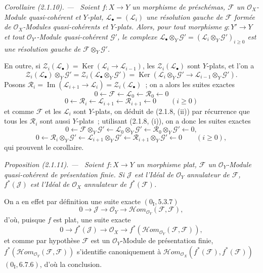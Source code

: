 \documentclass[10pt,oneside]{book}
\newcommand{\oldpage}[2][]{%
  \setcounter{footnote}{0}%
  \marginpar{\scriptsize\textbf{#1}~|~#2}\ignorespaces}
\newenvironment{proposition}[1][]{%
  \par\medskip\noindent\itshape Proposition (#1). ---\ }{\par}
\newenvironment{corollary}[1][]{%
  \par\medskip\noindent\itshape Corollaire (#1). ---\ }{\par}
\begin{document}
\oldpage[IV-2]{8}
\begin{corollary}[2.1.10]
\label{IV.2.1.10-fr}
Soient $f:X\to Y$ un morphisme de préschémas, $\mathscr F$ un
$\mathcal O_X$-Module quasi-cohérent et $Y$-plat,
$\mathscr L_\bullet=(\mathscr L_i)$ une résolution gauche de $\mathscr F$
formée de $\mathcal O_X$-Modules quasi-cohérents et $Y$-plats. Alors, pour
tout morphisme $g:Y'\to Y$ et tout $\mathcal O_{Y'}$-Module quasi-cohérent
$\mathscr G'$, le complexe
$\mathscr L_\bullet\otimes_Y\mathscr G'=
(\mathscr L_i\otimes_Y\mathscr G')_{i\geq0}$ est une résolution gauche de
$\mathscr F\otimes_Y\mathscr G'$.

En outre, si
$\mathscr Z_i(\mathscr L_\bullet)=\operatorname{Ker}
(\mathscr L_i\to\mathscr L_{i-1})$, les $\mathscr Z_i(\mathscr L_\bullet)$
sont $Y$-plats, et l'on a
\[
\mathscr Z_i(\mathscr L_\bullet)\otimes_Y\mathscr G'
=\mathscr Z_i(\mathscr L_\bullet\otimes_Y\mathscr G')
=\operatorname{Ker}(\mathscr L_i\otimes_Y\mathscr G'
\to\mathscr L_{i-1}\otimes_Y\mathscr G').
\]
Posons
$\mathscr R_i=\operatorname{Im}(\mathscr L_{i+1}\to\mathscr L_i)
=\mathscr Z_i(\mathscr L_\bullet)$~; on a alors les suites exactes
\[
0\leftarrow\mathscr F\leftarrow\mathscr L_0\leftarrow\mathscr R_0\leftarrow0
\]
\[
0\leftarrow\mathscr R_i\leftarrow\mathscr L_{i+1}
\leftarrow\mathscr R_{i+1}\leftarrow0\qquad(i\geq0)
\]
et comme $\mathscr F$ et les $\mathscr L_i$ sont $Y$-plats, on déduit de
(2.1.8, (ii)) par récurrence que tous les $\mathscr R_i$ sont aussi
$Y$-plats~; utilisant (2.1.8, (i)), on a donc les suites exactes
\[
0\leftarrow\mathscr F\otimes_Y\mathscr G'
\leftarrow\mathscr L_0\otimes_Y\mathscr G'
\leftarrow\mathscr R_0\otimes_Y\mathscr G'\leftarrow0,
\]
\[
0\leftarrow\mathscr R_i\otimes_Y\mathscr G'
\leftarrow\mathscr L_{i+1}\otimes_Y\mathscr G'
\leftarrow\mathscr R_{i+1}\otimes_Y\mathscr G'\leftarrow0
\qquad(i\geq0),
\]
qui prouvent le corollaire.
\end{corollary}

\begin{proposition}[2.1.11]
\label{IV.2.1.11-fr}
Soient $f:X\to Y$ un morphisme plat, $\mathscr F$ un $\mathcal O_Y$-Module
quasi-cohérent de présentation finie. Si $\mathscr J$ est l'Idéal de
$\mathcal O_Y$ annulateur de $\mathscr F$, $f^*(\mathscr J)$ est l'Idéal de
$\mathcal O_X$ annulateur de $f^*(\mathscr F)$.
\end{proposition}

On a en effet par définition une suite exacte $(0_{\mathrm I},5.3.7)$
\[
0\to\mathscr J\to\mathcal O_Y\to
\mathscr H\!om_{\mathcal O_Y}(\mathscr F,\mathscr F),
\]
d'où, puisque $f$ est plat, une suite exacte
\[
0\to f^*(\mathscr J)\to\mathcal O_X\to
f^*(\mathscr H\!om_{\mathcal O_Y}(\mathscr F,\mathscr F)),
\]
et comme par hypothèse $\mathscr F$ est un $\mathcal O_Y$-Module de
présentation finie,
$f^*(\mathscr H\!om_{\mathcal O_Y}(\mathscr F,\mathscr F))$ s'identifie
canoniquement à
$\mathscr H\!om_{\mathcal O_X}(f^*(\mathscr F),f^*(\mathscr F))$
$(0_{\mathrm I},6.7.6)$, d'où la conclusion.
\end{document}
